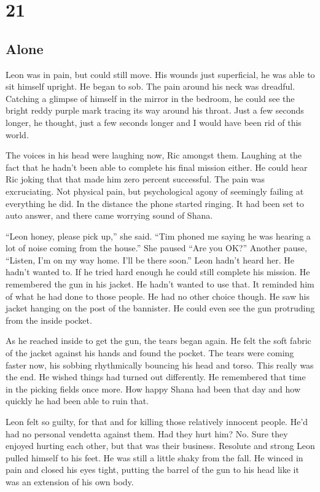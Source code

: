 \chapter{21}
\section{Alone}


Leon was in pain, but could still move.  His wounds just superficial, he was able to sit himself upright.  He began to sob.  The pain around his neck was dreadful.  Catching a glimpse of himself in the mirror in the bedroom, he could see the bright reddy purple mark tracing its way around his throat.  Just a few seconds longer, he thought, just a few seconds longer and I would have been rid of this world.  

The voices in his head were laughing now, Ric amongst them.  Laughing at the fact that he hadn't been able to complete his final mission either.  He could hear Ric joking that that made him zero percent successful.  The pain was excruciating.  Not physical pain, but psychological agony of seemingly failing at everything he did.  In the distance the phone started ringing.  It had been set to auto answer, and there came worrying sound of Shana.

``Leon honey, please pick up,'' she said.  ``Tim phoned me saying he was hearing a lot of noise coming from the house.''  She paused  ``Are you OK?''  Another pause, ``Listen, I'm on my way home.  I'll be there soon.''  Leon hadn't heard her.  He hadn't wanted to.  If he tried hard enough he could still complete his mission.  He remembered the gun in his jacket.  He hadn't wanted to use that.  It reminded him of what he had done to those people.  He had no other choice though.  He saw his jacket hanging on the post of the bannister.  He could even see the gun protruding from the inside pocket.

As he reached inside to get the gun, the tears began again.  He felt the soft fabric of the jacket against his hands and found the pocket.  The tears were coming faster now, his sobbing rhythmically bouncing his head and torso.  This really was the end.  He wished things had turned out differently.  He remembered that time in the picking fields once more.  How happy Shana had been that day and how quickly he had been able to ruin that.  

Leon felt so guilty, for that and for killing those relatively innocent people.  He'd had no personal vendetta against them.  Had they hurt him?  No.  Sure they enjoyed hurting each other, but that was their business.  Resolute and strong Leon pulled himself to his feet.  He was still a little shaky from the fall.  He winced in pain and closed his eyes tight, putting the barrel of the gun to his head like it was an extension of his own body.  

